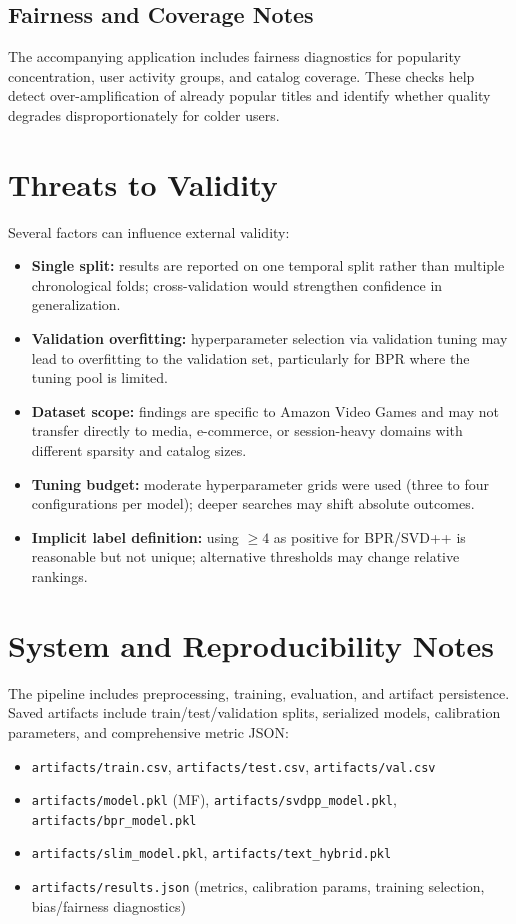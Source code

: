 \documentclass[sigconf,nonacm]{acmart}
\begin{document}
\subsection{Fairness and Coverage Notes}
The accompanying application includes fairness diagnostics for popularity concentration, user activity groups, and catalog coverage. These checks help detect over-amplification of already popular titles and identify whether quality degrades disproportionately for colder users.

\section{Threats to Validity}
Several factors can influence external validity:
\begin{itemize}
  \item \textbf{Single split:} results are reported on one temporal split rather than multiple chronological folds; cross-validation would strengthen confidence in generalization.
  \item \textbf{Validation overfitting:} hyperparameter selection via validation tuning may lead to overfitting to the validation set, particularly for BPR where the tuning pool is limited.
  \item \textbf{Dataset scope:} findings are specific to Amazon Video Games and may not transfer directly to media, e-commerce, or session-heavy domains with different sparsity and catalog sizes.
  \item \textbf{Tuning budget:} moderate hyperparameter grids were used (three to four configurations per model); deeper searches may shift absolute outcomes.
  \item \textbf{Implicit label definition:} using $\ge 4$ as positive for BPR/SVD++ is reasonable but not unique; alternative thresholds may change relative rankings.
\end{itemize}

\section{System and Reproducibility Notes}
The pipeline includes preprocessing, training, evaluation, and artifact persistence. Saved artifacts include train/test/validation splits, serialized models, calibration parameters, and comprehensive metric JSON:
\begin{itemize}
  \item \texttt{artifacts/train.csv}, \texttt{artifacts/test.csv}, \texttt{artifacts/val.csv}
  \item \texttt{artifacts/model.pkl} (MF), \texttt{artifacts/svdpp\_model.pkl}, \texttt{artifacts/bpr\_model.pkl}
  \item \texttt{artifacts/slim\_model.pkl}, \texttt{artifacts/text\_hybrid.pkl}
  \item \texttt{artifacts/results.json} (metrics, calibration params, training selection, bias/fairness diagnostics)
\end{itemize}
\end{document}
